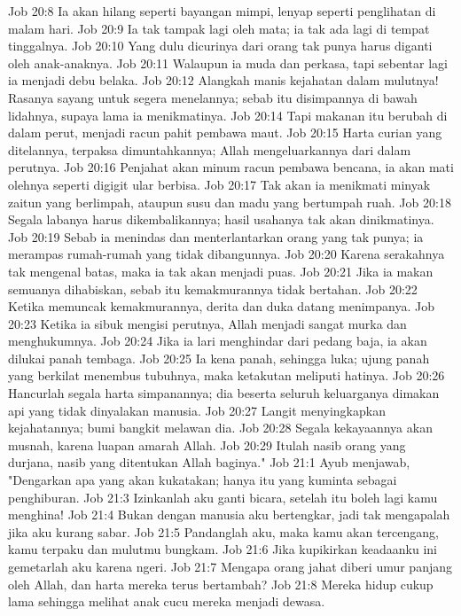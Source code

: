 Job 20:8  Ia akan hilang seperti bayangan mimpi, lenyap seperti penglihatan di malam hari.
Job 20:9  Ia tak tampak lagi oleh mata; ia tak ada lagi di tempat tinggalnya.
Job 20:10  Yang dulu dicurinya dari orang tak punya harus diganti oleh anak-anaknya.
Job 20:11  Walaupun ia muda dan perkasa, tapi sebentar lagi ia menjadi debu belaka.
Job 20:12  Alangkah manis kejahatan dalam mulutnya! Rasanya sayang untuk segera menelannya; sebab itu disimpannya di bawah lidahnya, supaya lama ia menikmatinya.
Job 20:14  Tapi makanan itu berubah di dalam perut, menjadi racun pahit pembawa maut.
Job 20:15  Harta curian yang ditelannya, terpaksa dimuntahkannya; Allah mengeluarkannya dari dalam perutnya.
Job 20:16  Penjahat akan minum racun pembawa bencana, ia akan mati olehnya seperti digigit ular berbisa.
Job 20:17  Tak akan ia menikmati minyak zaitun yang berlimpah, ataupun susu dan madu yang bertumpah ruah.
Job 20:18  Segala labanya harus dikembalikannya; hasil usahanya tak akan dinikmatinya.
Job 20:19  Sebab ia menindas dan menterlantarkan orang yang tak punya; ia merampas rumah-rumah yang tidak dibangunnya.
Job 20:20  Karena serakahnya tak mengenal batas, maka ia tak akan menjadi puas.
Job 20:21  Jika ia makan semuanya dihabiskan, sebab itu kemakmurannya tidak bertahan.
Job 20:22  Ketika memuncak kemakmurannya, derita dan duka datang menimpanya.
Job 20:23  Ketika ia sibuk mengisi perutnya, Allah menjadi sangat murka dan menghukumnya.
Job 20:24  Jika ia lari menghindar dari pedang baja, ia akan dilukai panah tembaga.
Job 20:25  Ia kena panah, sehingga luka; ujung panah yang berkilat menembus tubuhnya, maka ketakutan meliputi hatinya.
Job 20:26  Hancurlah segala harta simpanannya; dia beserta seluruh keluarganya dimakan api yang tidak dinyalakan manusia.
Job 20:27  Langit menyingkapkan kejahatannya; bumi bangkit melawan dia.
Job 20:28  Segala kekayaannya akan musnah, karena luapan amarah Allah.
Job 20:29  Itulah nasib orang yang durjana, nasib yang ditentukan Allah baginya."
Job 21:1  Ayub menjawab, "Dengarkan apa yang akan kukatakan; hanya itu yang kuminta sebagai penghiburan.
Job 21:3  Izinkanlah aku ganti bicara, setelah itu boleh lagi kamu menghina!
Job 21:4  Bukan dengan manusia aku bertengkar, jadi tak mengapalah jika aku kurang sabar.
Job 21:5  Pandanglah aku, maka kamu akan tercengang, kamu terpaku dan mulutmu bungkam.
Job 21:6  Jika kupikirkan keadaanku ini gemetarlah aku karena ngeri.
Job 21:7  Mengapa orang jahat diberi umur panjang oleh Allah, dan harta mereka terus bertambah?
Job 21:8  Mereka hidup cukup lama sehingga melihat anak cucu mereka menjadi dewasa.
